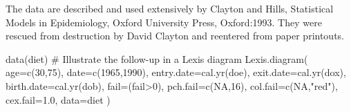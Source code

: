 \begin{Source}\relax
The data are described and used extensively by Clayton and Hills,
Statistical Models in Epidemiology, Oxford University Press,
Oxford:1993. They were rescued from destruction by David Clayton and
reentered from paper printouts.
\end{Source}
\begin{Examples}
\begin{ExampleCode}
data(diet)
# Illustrate the follow-up in a Lexis diagram
Lexis.diagram( age=c(30,75), date=c(1965,1990),
               entry.date=cal.yr(doe), exit.date=cal.yr(dox), birth.date=cal.yr(dob), 
               fail=(fail>0), pch.fail=c(NA,16), col.fail=c(NA,"red"), cex.fail=1.0,
               data=diet )

\end{ExampleCode}
\end{Examples}

